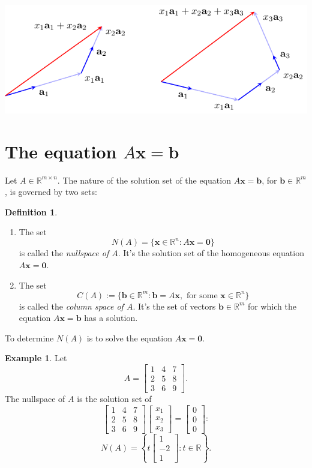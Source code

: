 \documentclass[12pt]{amsart}
\newcommand{\RR}{\mathbb{R}}
\theoremstyle{definition} \newtheorem{definition}[theorem]{Definition}
\newtheorem{example}[theorem]{Example}
\newcommand{\bb}{\mathbf{b}}
\newcommand{\bx}{\mathbf{x}}
\newcommand{\bzero}{\mathbf{0}}
\newcommand{\mat}[1]{\begin{bmatrix}#1\end{bmatrix}}
\newcommand{\setstuff}{\setlength{\parskip}{0.5em}\setlength{\parindent}{0em}\setlength{\itemsep}{0.5em}}
\begin{document}
\setstuff

\includegraphics[scale=1.5]{lincombs.pdf}

\section{The equation $A\bx=\bb$}

Let $A\in\RR^{m\times n}$.
The nature of the solution set of the equation $A\bx=\bb$, for $\bb\in\RR^m$, is governed by two sets:

\begin{definition}\label{df:col_space}\hfill
  \begin{enumerate}\setstuff
    \item The set
    \[ N(A) = \{\bx\in\RR^n : A\bx=\bzero\} \]
      is called the \emph{nullspace of $A$}. It's the solution set of the homogeneous equation $A\bx=\bzero$.
   \item The set
     \[ C(A) := \{\bb\in\RR^m :	\bb=A\bx,\text{ for some }\bx\in\RR^n\} \]
    is called the \emph{column space of $A$}. It's the set of vectors $\bb\in\RR^m$ for which the equation $A\bx=\bb$ has a solution.
  \end{enumerate}
\end{definition}

To determine $N(A)$ is to solve the equation $A\bx=\bzero$.
\begin{example}\label{eg:nullspace}
  Let
  \[
    A = \mat{1&4&7\\2&5&8\\3&6&9}.
  \]
  The nullspace of $A$ is the solution set of
  \[
    \mat{1&4&7\\2&5&8\\3&6&9}\mat{x_1\\x_2\\x_3}=\mat{0\\0\\0}:
  \]
  \[
    N(A) =\left\{t\mat{1\\-2\\1} : t\in\RR\right\}.
  \]
\end{example}
\end{document}
